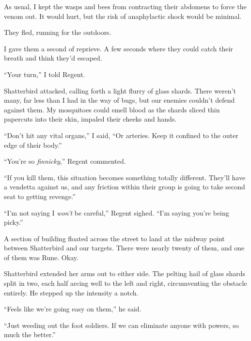 As usual, I kept the wasps and bees from contracting their abdomens to force the venom out.  It would hurt, but the risk of anaphylactic shock would be minimal.



They fled, running for the outdoors.



I gave them a second of reprieve.  A few seconds where they could catch their breath and think they'd escaped.



``Your turn,'' I told Regent.



Shatterbird attacked, calling forth a light flurry of glass shards.  There weren't many, far less than I had in the way of bugs, but our enemies couldn't defend against them.  My mosquitoes could smell blood as the shards sliced thin papercuts into their skin, impaled their cheeks and hands.



``Don't hit any vital organs,'' I said, ``Or arteries.  Keep it confined to the outer edge of their body.''



``You're so \emph{finnicky},'' Regent commented.



``If you kill them, this situation becomes something totally different.  They'll have a vendetta against us, and any friction within their group is going to take second seat to getting revenge.''



``I'm not saying I \emph{won't} be careful,'' Regent sighed.  ``I'm saying you're being picky.''



A section of building floated across the street to land at the midway point between Shatterbird and our targets.  There were nearly twenty of them, and one of them was Rune.  Okay.



Shatterbird extended her arms out to either side.  The pelting hail of glass shards split in two, each half arcing well to the left and right, circumventing the obstacle entirely.  He stepped up the intensity a notch.



``Feels like we're going easy on them,'' he said.



``Just weeding out the foot soldiers.  If we can eliminate anyone with powers, so much the better.''



